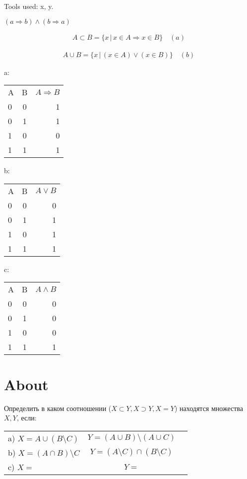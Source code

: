 \documentclass{spaceC}
\begin{document}
\begin{aling*}
  
Tools used: x, y.

$(a \Rightarrow b) \land (b \Rightarrow a)$

\begin{align*}
  A \subset B = \{ x \, \vert \, x \in A \Rightarrow x \in B \} \quad (a)
\end{align*}

\begin{align*}
  A \cup B = \{ x \, \vert \, (x \in A) \lor (x \in B) \} \quad (b)
\end{align*}

a:
\begin{tabular}{l c r}
  A & B & $A \Rightarrow B$ \\
  0 & 0 & 1 \\
  0 & 1 & 1 \\
  1 & 0 & 0 \\
  1 & 1 & 1
\end{tabular}
b:
\begin{tabular}{l c r}
  A & B & $A \lor B$ \\
  0 & 0 & 0 \\
  0 & 1 & 1 \\
  1 & 0 & 1 \\
  1 & 1 & 1
\end{tabular}
c:
\begin{tabular}{l c r}
  A & B & $A \land B$ \\
  0 & 0 & 0 \\
  0 & 1 & 0 \\
  1 & 0 & 0 \\
  1 & 1 & 1
\end{tabular}

\csec

\section{About} Определить в каком соотношении ($X \subset Y, X \supset Y, X = Y$) находятся множества $X, Y$, если:
    
\begin{tabular}{l c r}
  a) $X = A \cup (B \setminus C)$ & $Y = (A \cup B) \setminus (A \cup C)$ \\
  b) $X = \left ( A \cap B \right ) \setminus C$ & $Y = \left ( A \setminus C \right ) \cap \left ( B \setminus C \right )$ \\
  c) $X = $ & $Y = $
\end{tabular}


\end{aling*}
\end{document}

